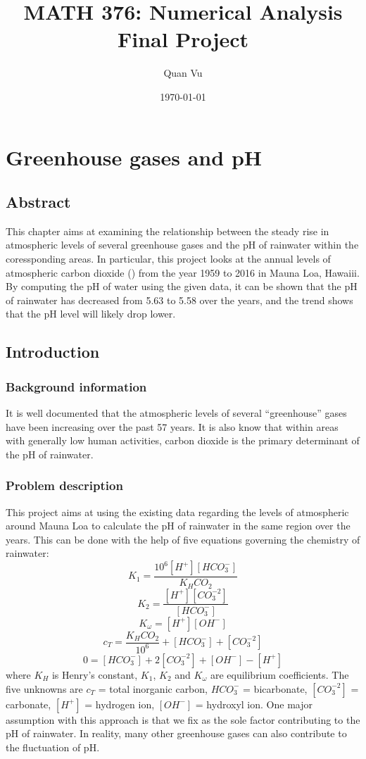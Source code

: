 \documentclass{book}
\title{%
	MATH 376: Numerical Analysis \\
	\large  Final Project
	}
\author{Quan Vu}
\date{\today}
\begin{document}
	\maketitle
	\chapter{Greenhouse gases and pH}
	\section{Abstract}
	This chapter aims at examining the relationship between the steady 	rise in atmospheric levels of several greenhouse gases and the pH of rainwater within the coressponding areas. In particular, this project looks at the annual levels of atmospheric carbon dioxide () from the year 1959 to 2016 in Mauna Loa, Hawaiii. By computing the pH of water using the given data, it can be shown that the pH of rainwater has decreased from 5.63 to 5.58 over the years, and the trend shows that the pH level will likely drop lower.
	
	\section{Introduction}
	
	\subsection{Background information}
	It is well documented that the atmospheric levels of several “greenhouse” gases have been increasing over the past 57 years. It is also know that within areas with generally low human activities, carbon dioxide is the primary determinant of the pH of rainwater.
	
	\subsection{Problem description}
	This project aims at using the existing data regarding the levels of atmospheric  around Mauna Loa to calculate the pH of rainwater in the same region over the years. This can be done with the help of five equations governing the chemistry of rainwater:
	\[ K_1 = \frac{10^6[H^+][HCO_3^-]}{K_HCO_2} \tag{1} \]
	\[ K_2 = \frac{[H^+][CO_3^{-2}]}{[HCO_3^-]} \tag{2} \]
	\[ K_\omega = [H^+][OH^-] \tag{3} \]
	\[ c_T = \frac{K_HCO_2}{10^6} + [HCO_3^-] + [CO_3^{-2}] \tag{4} \]
	\[ 0 = [HCO_3^-] + 2[CO_3^{-2}] + [OH^-] - [H^+] \tag{5} \]
	where ${K_H}$ is Henry's constant, ${K_1}$, ${K_2}$ and ${K_\omega}$ are equilibrium coefficients. The five unknowns are ${c_T}$ = total inorganic carbon, ${HCO_3^-}$ = bicarbonate, ${[CO_3^{-2}]}$ = carbonate, ${[H^+]}$ = hydrogen ion, ${[OH^-]}$ = hydroxyl ion.
	One major assumption with this approach is that we fix  as the sole factor contributing to the pH of rainwater. In reality, many other greenhouse gases can also contribute to the fluctuation of pH.
\end{document}
